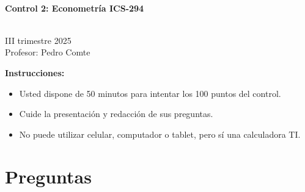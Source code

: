 \documentclass[10pt,a4paper]{article}
\begin{document}
\vspace{5cm}



\begin{center}
\begin{large}
\textbf{\\Control 2: Econometría ICS-294}
\end{large}\\
\vspace{0.2cm}
III trimestre 2025\\
Profesor: Pedro Comte\\
\end{center}

\textbf{Instrucciones:} 

\begin{itemize}

    \item Usted dispone de 50 minutos  para intentar los 100 puntos del control.
    \item Cuide la presentación y redacción de sus preguntas.
    \item No puede utilizar celular, computador o tablet, pero sí una calculadora TI.
     
\end{itemize}

\section{Preguntas}
\end{document}
